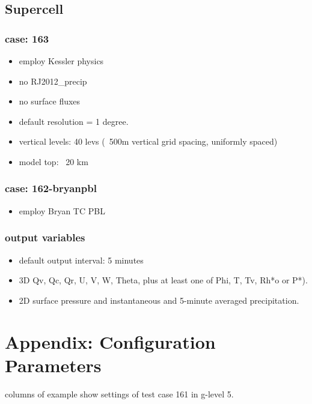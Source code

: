 \documentclass[a4paper]{article}
\begin{document}
\subsection{Supercell}
\subsubsection{case: 163}
 \begin{itemize}
   \item employ Kessler physics
   \item no RJ2012\_precip
   \item no surface fluxes
   \item default resolution = 1 degree.
   \item vertical levels: 40 levs (~500m vertical grid spacing, uniformly spaced)
   \item model top: ~20 km
 \end{itemize}

\subsubsection{case: 162-bryanpbl}
 \begin{itemize}
   \item employ Bryan TC PBL
 \end{itemize}

\subsubsection{output variables}
 \begin{itemize}
   \item default output interval: 5 minutes
   \item 3D Qv, Qc, Qr, U, V, W, Theta, plus at least one of Phi, T, Tv, Rh*o or P*).
   \item 2D surface pressure and instantaneous and 5-minute averaged precipitation.
 \end{itemize}

\clearpage

\section{Appendix: Configuration Parameters}

 columns of example show settings of test case 161 in g-level 5. 
\end{document}
